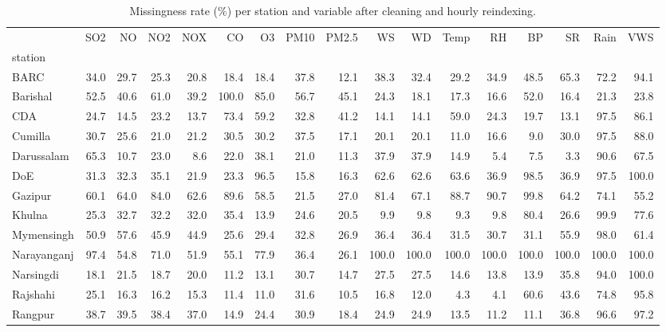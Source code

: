 \begin{table}
\caption{Missingness rate (\%) per station and variable after cleaning and hourly reindexing.}
\label{tab:missingness_station_variable}
\begin{tabular}{lrrrrrrrrrrrrrrrr}
\toprule
 & SO2 & NO & NO2 & NOX & CO & O3 & PM10 & PM2.5 & WS & WD & Temp & RH & BP & SR & Rain & VWS \\
station &  &  &  &  &  &  &  &  &  &  &  &  &  &  &  &  \\
\midrule
BARC & 34.0 & 29.7 & 25.3 & 20.8 & 18.4 & 18.4 & 37.8 & 12.1 & 38.3 & 32.4 & 29.2 & 34.9 & 48.5 & 65.3 & 72.2 & 94.1 \\
Barishal & 52.5 & 40.6 & 61.0 & 39.2 & 100.0 & 85.0 & 56.7 & 45.1 & 24.3 & 18.1 & 17.3 & 16.6 & 52.0 & 16.4 & 21.3 & 23.8 \\
CDA & 24.7 & 14.5 & 23.2 & 13.7 & 73.4 & 59.2 & 32.8 & 41.2 & 14.1 & 14.1 & 59.0 & 24.3 & 19.7 & 13.1 & 97.5 & 86.1 \\
Cumilla & 30.7 & 25.6 & 21.0 & 21.2 & 30.5 & 30.2 & 37.5 & 17.1 & 20.1 & 20.1 & 11.0 & 16.6 & 9.0 & 30.0 & 97.5 & 88.0 \\
Darussalam & 65.3 & 10.7 & 23.0 & 8.6 & 22.0 & 38.1 & 21.0 & 11.3 & 37.9 & 37.9 & 14.9 & 5.4 & 7.5 & 3.3 & 90.6 & 67.5 \\
DoE & 31.3 & 32.3 & 35.1 & 21.9 & 23.3 & 96.5 & 15.8 & 16.3 & 62.6 & 62.6 & 63.6 & 36.9 & 98.5 & 36.9 & 97.5 & 100.0 \\
Gazipur & 60.1 & 64.0 & 84.0 & 62.6 & 89.6 & 58.5 & 21.5 & 27.0 & 81.4 & 67.1 & 88.7 & 90.7 & 99.8 & 64.2 & 74.1 & 55.2 \\
Khulna & 25.3 & 32.7 & 32.2 & 32.0 & 35.4 & 13.9 & 24.6 & 20.5 & 9.9 & 9.8 & 9.3 & 9.8 & 80.4 & 26.6 & 99.9 & 77.6 \\
Mymensingh & 50.9 & 57.6 & 45.9 & 44.9 & 25.6 & 29.4 & 32.8 & 26.9 & 36.4 & 36.4 & 31.5 & 30.7 & 31.1 & 55.9 & 98.0 & 61.4 \\
Narayanganj & 97.4 & 54.8 & 71.0 & 51.9 & 55.1 & 77.9 & 36.4 & 26.1 & 100.0 & 100.0 & 100.0 & 100.0 & 100.0 & 100.0 & 100.0 & 100.0 \\
Narsingdi & 18.1 & 21.5 & 18.7 & 20.0 & 11.2 & 13.1 & 30.7 & 14.7 & 27.5 & 27.5 & 14.6 & 13.8 & 13.9 & 35.8 & 94.0 & 100.0 \\
Rajshahi & 25.1 & 16.3 & 16.2 & 15.3 & 11.4 & 11.0 & 31.6 & 10.5 & 16.8 & 12.0 & 4.3 & 4.1 & 60.6 & 43.6 & 74.8 & 95.8 \\
Rangpur & 38.7 & 39.5 & 38.4 & 37.0 & 14.9 & 24.4 & 30.9 & 18.4 & 24.9 & 24.9 & 13.5 & 11.2 & 11.1 & 36.8 & 96.6 & 97.2 \\

\end{tabular}
\end{table}
